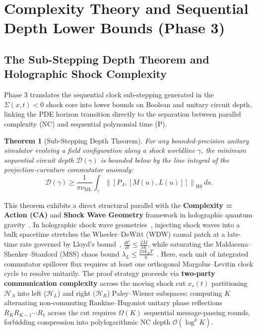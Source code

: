 \documentclass[11pt,a4paper]{article}
\newtheorem{theorem}{Theorem}[section]
\theoremstyle{definition}
\begin{document}
\section{Complexity Theory and Sequential Depth Lower Bounds (Phase 3)}
\label{sec:phase3}
\subsection{The Sub-Stepping Depth Theorem and Holographic Shock Complexity}
\label{subsec:phase3-substepping}
Phase 3 translates the sequential clock sub-stepping generated in the $\Sigma(x, t) < 0$ shock core into lower bounds on Boolean and unitary circuit depth, linking the PDE horizon transition directly to the separation between parallel complexity ($\mathrm{NC}$) and sequential polynomial time ($\mathrm{P}$).
\begin{theorem}[Sub-Stepping Depth Theorem]
\label{thm:substepping-depth}
For any bounded-precision unitary simulator evolving a field configuration along a shock worldline $\gamma$, the minimum sequential circuit depth $\mathcal{D}(\gamma)$ is bounded below by the line integral of the projection-curvature commutator anomaly:
\begin{equation}
\mathcal{D}(\gamma) \ge \frac{1}{\pi \nu_{\text{ML}}} \int_{\gamma} \left\| [P_{\Lambda}, [M(u), L(u)]] \right\|_{\text{HS}} \, ds.
\end{equation}
\end{theorem}
This theorem exhibits a direct structural parallel with the \textbf{Complexity = Action (CA)} and \textbf{Shock Wave Geometry} framework in holographic quantum gravity~\cite{stanford2014,brown2016,maldacena2016}. In holographic shock wave geometries~\cite{stanford2014}, injecting shock waves into a bulk spacetime stretches the Wheeler--DeWitt (WDW) causal patch at a late-time rate governed by Lloyd's bound~\cite{lloyd2000,brown2016}, $\frac{d\mathcal{C}}{dt} \le \frac{2M}{\pi \hbar}$, while saturating the Maldacena--Shenker--Stanford (MSS) chaos bound $\lambda_L \le \frac{2\pi k_B T}{\hbar}$~\cite{maldacena2016}. Here, each unit of integrated commutator spillover flux requires at least one orthogonal Margolus--Levitin clock cycle to resolve unitarily.
The proof strategy proceeds via \textbf{two-party communication complexity} across the moving shock cut $x_s(t)$ partitioning $\mathcal{H}_{\Lambda}$ into left ($\mathcal{H}_L$) and right ($\mathcal{H}_R$) Paley--Wiener subspaces: computing $K$ alternating non-commuting Rankine--Hugoniot unitary phase reflections $R_K R_{K-1} \cdots R_1$ across the cut requires $\Omega(K)$ sequential message-passing rounds, forbidding compression into polylogarithmic $\mathrm{NC}$ depth $\mathcal{O}(\log^k K)$.
\end{document}
